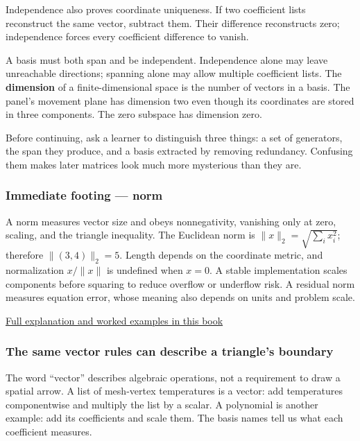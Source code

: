 Independence also proves coordinate uniqueness. If two coefficient lists reconstruct the same vector, subtract them. Their difference reconstructs zero; independence forces every coefficient difference to vanish.

A basis must both span and be independent. Independence alone may leave unreachable directions; spanning alone may allow multiple coefficient lists. The \textbf{dimension} of a finite-dimensional space is the number of vectors in a basis. The panel's movement plane has dimension two even though its coordinates are stored in three components. The zero subspace has dimension zero.

Before continuing, ask a learner to distinguish three things: a set of generators, the span they produce, and a basis extracted by removing redundancy. Confusing them makes later matrices look much more mysterious than they are.

\subsubsection{Immediate footing --- norm}\label{01-foundations-i-ch017-immediate-footing-norm}

\hypertarget{01-foundations-i-ch017-immediate-footing-norm}{}

A norm measures vector size and obeys nonnegativity, vanishing only at zero, scaling, and the triangle inequality. The Euclidean norm is \(\|x\|_2=\sqrt{\sum_i x_i^2}\); therefore \(\|(3,4)\|_2=5\). Length depends on the coordinate metric, and normalization \(x/\|x\|\) is undefined when \(x=0\). A stable implementation scales components before squaring to reduce overflow or underflow risk. A residual norm measures equation error, whose meaning also depends on units and problem scale.

\hyperref[01-foundations-i-ch017-a-ruler-needs-more-than-coordinate-components]{Full explanation and worked examples in this book}

\subsubsection{The same vector rules can describe a triangle's boundary}\label{01-foundations-i-ch017-the-same-vector-rules-can-describe-a-triangles-boundary}

\hypertarget{01-foundations-i-ch017-the-same-vector-rules-can-describe-a-triangles-boundary}{}

The word ``vector'' describes algebraic operations, not a requirement to draw a spatial arrow. A list of mesh-vertex temperatures is a vector: add temperatures componentwise and multiply the list by a scalar. A polynomial is another example: add its coefficients and scale them. The basis names tell us what each coefficient measures.

